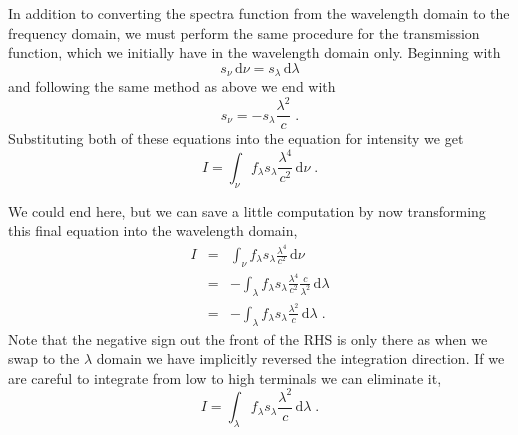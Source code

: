 \documentclass[12pt]{scrartcl}
\newcommand{\dx}[1]{\ensuremath{\,\mathrm{d}#1}}
\begin{document}
In addition to converting the spectra function from the wavelength domain
to the frequency domain, we must perform the same procedure for the
transmission function, which we initially have in the wavelength domain
only. Beginning with
\[ s_\nu \dx{\nu} = s_\lambda \dx{\lambda} \]
and following the same method as above we end with
\[ s_\nu = -s_\lambda \frac{\lambda^2}{c} \; . \]
Substituting both of these equations into the equation for intensity
we get
\[ I = \int_\nu f_\lambda s_\lambda\frac{\lambda^4}{c^2}\dx{\nu} \; . \]

We could end here, but we can save a little computation by now transforming
this final equation into the wavelength domain,
\begin{eqnarray*}
I & = & \int_\nu f_\lambda s_\lambda\frac{\lambda^4}{c^2}\dx{\nu} \\
& = & -\int_\lambda f_\lambda s_\lambda\frac{\lambda^4}{c^2} \frac{c}{\lambda^2} \dx{\lambda} \\
& = & -\int_\lambda f_\lambda s_\lambda\frac{\lambda^2}{c} \dx{\lambda} \; .
\end{eqnarray*}
Note that the negative sign out the front of the RHS is only there
as when we swap to the $\lambda$ domain we have implicitly reversed the
integration direction. If we are careful to integrate from low to high
terminals we can eliminate it,
\[ I = \int_\lambda f_\lambda s_\lambda\frac{\lambda^2}{c} \dx{\lambda} \; . \]
\end{document}
